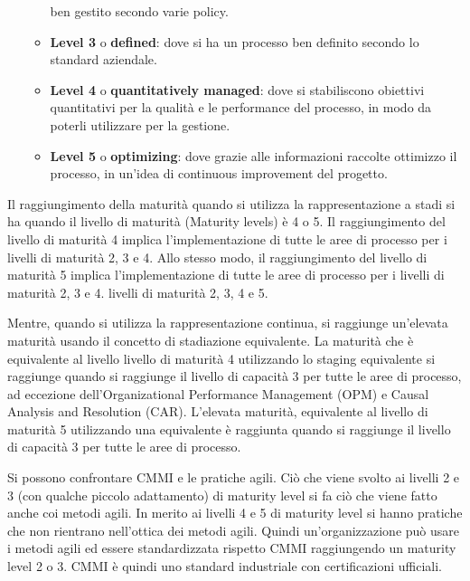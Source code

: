 \begin{enumerate}
\begin{itemize}
                        ben gestito secondo varie policy.
                  \item \textbf{Level 3} o \textbf{defined}: dove si ha un processo
                        ben definito secondo lo standard aziendale.
                  \item \textbf{Level 4} o \textbf{quantitatively managed}: dove
                        si stabiliscono obiettivi quantitativi per la qualità e
                        le performance del processo, in modo da poterli utilizzare
                        per la gestione.
                  \item \textbf{Level 5} o \textbf{optimizing}: dove grazie alle
                        informazioni raccolte ottimizzo il processo, in un'idea di
                        continuous improvement del progetto.
            \end{itemize}
\end{enumerate}
Il raggiungimento della maturità quando si utilizza la rappresentazione a stadi
si ha quando il livello di maturità (Maturity levels) è 4 o 5. Il raggiungimento
del livello di maturità 4 implica l'implementazione di tutte le aree di processo
per i livelli di maturità 2, 3 e 4. Allo stesso modo, il raggiungimento del livello
di maturità 5 implica l'implementazione di tutte le aree di processo per i
livelli di maturità 2, 3 e 4. livelli di maturità 2, 3, 4 e 5.

Mentre, quando si utilizza la rappresentazione continua, si raggiunge un'elevata
maturità usando il concetto di stadiazione equivalente. La maturità che è
equivalente al livello livello di maturità 4 utilizzando lo staging equivalente
si raggiunge quando si raggiunge il livello di capacità 3 per tutte le aree di
processo, ad eccezione dell'Organizational Performance Management (OPM) e Causal
Analysis and Resolution (CAR). L'elevata maturità, equivalente al livello di
maturità 5 utilizzando una equivalente è raggiunta quando si raggiunge il livello
di capacità 3 per tutte le aree di processo.

Si possono confrontare CMMI e le pratiche agili. Ciò che viene svolto ai livelli
2 e 3 (con qualche piccolo adattamento) di maturity level si fa ciò che viene
fatto anche coi metodi agili. In merito ai livelli 4 e 5 di maturity level si hanno
pratiche che non rientrano nell'ottica dei metodi agili. Quindi un'organizzazione
può usare i metodi agili ed essere standardizzata rispetto CMMI raggiungendo
un maturity level 2 o 3. CMMI è quindi uno standard industriale con certificazioni
ufficiali.